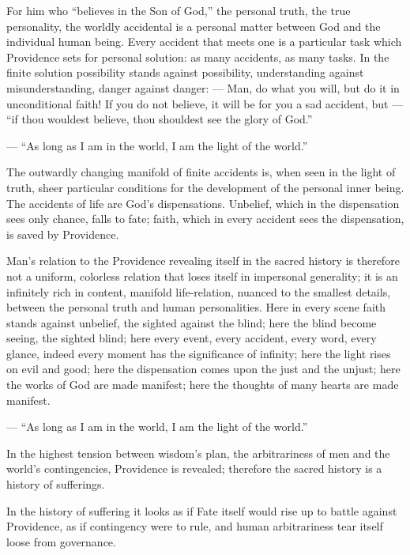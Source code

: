 \documentclass[12pt,a4paper,openany]{book}
\newcommand{\opage}[1]{\marginnote{\footnotesize\textit{[#1]}}}
\begin{document}
For him who ``believes in the Son of God,'' the
personal truth, the true personality, the
worldly accidental is a personal matter
between God and the individual human being.
Every accident that meets one is a particular task
which Providence sets for personal solution: as many
accidents, as many tasks. In the
finite solution possibility stands against
possibility, understanding against misunderstanding, danger
against danger: --- Man, do what you will,
but do it in unconditional faith! If you do
not believe, it will be for you a sad accident,
but --- ``if thou wouldest believe, thou
shouldest see the glory of God.''

--- ``As long as I am in the world, I am the light of the world.''

The outwardly changing manifold of
finite accidents is, when seen in the light of
truth, sheer particular conditions for the
\setcounter{footnote}{0}%
\opage{40}development of the personal inner being. The accidents of life
are God's dispensations. Unbelief, which in
the dispensation sees only chance, falls to
fate; faith, which in every accident sees
the dispensation, is saved by Providence.

Man's relation to the Providence revealing itself in the sacred
history is therefore not
a uniform, colorless relation that loses itself
in impersonal generality; it is an infinitely
rich in content, manifold life-relation, nuanced to the smallest
details, between the personal
truth and human personalities.
Here in every scene faith stands against
unbelief, the sighted against the blind; here the
blind become seeing, the sighted blind; here
every event, every accident, every word,
every glance, indeed every moment has the significance
of infinity; here the light rises on evil and
good; here the dispensation comes upon the just
and the unjust; here the works of God are
made manifest; here the thoughts of many hearts are
made manifest.

--- ``As long as I am in the world, I am the light of the world.''

In the highest tension between
\setcounter{footnote}{0}%
\opage{41}wisdom's plan, the arbitrariness of men and the world's
contingencies, Providence is revealed;
therefore the sacred history is a history of
sufferings.

In the history of suffering it looks as if
Fate itself would rise up to battle against Providence,
as if contingency were to rule, and human
arbitrariness tear itself loose from governance.
\end{document}
